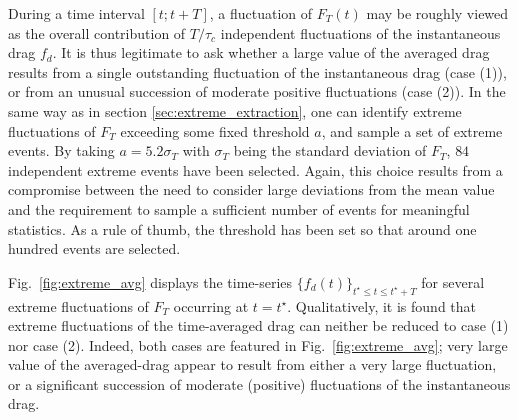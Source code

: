 %
During a time interval $[t;t+T]$, a fluctuation of $F_T(t)$ may be roughly viewed as the overall contribution of  $T / \tau_c$ independent fluctuations of the {instantaneous} drag $f_d$.
%
It is thus legitimate to ask whether a large value of the averaged drag results from a single outstanding fluctuation of the instantaneous drag (case (1)),  or from  an unusual succession of moderate positive fluctuations (case (2)).
%
In the same way as in section \ref{sec:extreme_extraction}, one can identify extreme fluctuations of $F_T$ exceeding some fixed threshold $a$, and sample a set of extreme events.
By taking $a=5.2\sigma_T$ with $\sigma_T$ being the standard deviation of $F_T$, $84$ independent extreme events have been selected.
Again, this choice results from a compromise between the need to consider large deviations from the mean value and the requirement to sample a sufficient number of events for meaningful statistics. As a rule of thumb, the threshold has been set so that around one hundred events are selected.


%
Fig.~\ref{fig:extreme_avg} displays the time-series $\{f_d(t)\}_{t^{\star} \leq t \leq t^{\star}+T}$ for several extreme fluctuations of $F_T$ occurring at $t=t^\star$.
Qualitatively, it is found that extreme fluctuations of the time-averaged drag can neither be reduced to case (1) nor case (2).
Indeed, both cases are %
featured in Fig.~\ref{fig:extreme_avg};
very large value of the averaged-drag appear to result from either a very large fluctuation, or a significant succession of moderate (positive) fluctuations of the instantaneous drag.

